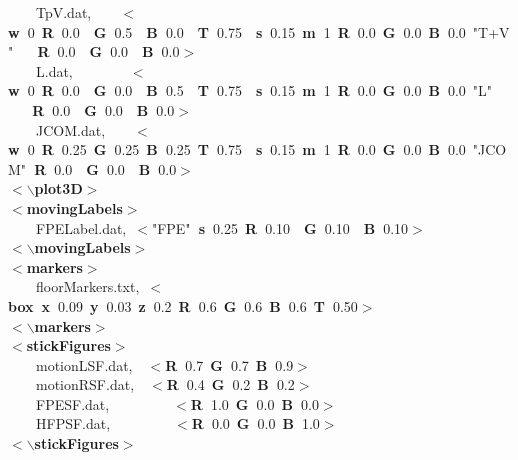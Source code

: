 \documentclass{article}
\newcommand{\hlstd}[1]{\textcolor[rgb]{0,0,0}{#1}}
\newcommand{\hlkey}[1]{\textcolor[rgb]{0,0,1}{\bf{#1}}}
\newcommand{\hlnum}[1]{\textcolor[rgb]{0.66,0,0.66}{#1}}
\newcommand{\hlstr}[1]{\textcolor[rgb]{1,0,0}{#1}}
\begin{document}
{\hlstd{\ \ \ \ }TpV.dat,\hlstd{\ \ \ \ }}\hlkey{$<$w\ }\hlnum{0\ }\hlkey{R\ }\hlnum{0.0\hlstd{\ \ }}\hlkey{G\ }\hlnum{0.5\hlstd{\ \ }}\hlkey{B\ }\hlnum{0.0\hlstd{\ \ }}\hlkey{T\ }\hlnum{0.75\hlstd{\ \ }}\hlkey{s\ }\hlnum{0.15\ }\hlkey{m\ }\hlnum{1\ }\hlkey{R\ }\hlnum{0.0\ }\hlkey{G\ }\hlnum{0.0\ }\hlkey{B\ }\hlnum{0.0\ }\hlkey{}\hlstr{"T+V"}\hlkey{\hlstd{\ \ \ }R\ }\hlnum{0.0\hlstd{\ \ }}\hlkey{G\ }\hlnum{0.0\hlstd{\ \ }}\hlkey{B\ }\hlnum{0.0}\hlkey{$>$}\hlstd{\\
\hlstd{\ \ \ \ }L.dat,\hlstd{\ \ \ \ \ \ \ \ }}\hlkey{$<$w\ }\hlnum{0\ }\hlkey{R\ }\hlnum{0.0\hlstd{\ \ }}\hlkey{G\ }\hlnum{0.0\hlstd{\ \ }}\hlkey{B\ }\hlnum{0.5\hlstd{\ \ }}\hlkey{T\ }\hlnum{0.75\hlstd{\ \ }}\hlkey{s\ }\hlnum{0.15\ }\hlkey{m\ }\hlnum{1\ }\hlkey{R\ }\hlnum{0.0\ }\hlkey{G\ }\hlnum{0.0\ }\hlkey{B\ }\hlnum{0.0\ }\hlkey{}\hlstr{"L"}\hlkey{\hlstd{\ \ \ \ \ }R\ }\hlnum{0.0\hlstd{\ \ }}\hlkey{G\ }\hlnum{0.0\hlstd{\ \ }}\hlkey{B\ }\hlnum{0.0}\hlkey{$>$}\hlstd{\\
\hlstd{\ \ \ \ }JCOM.dat,\hlstd{\ \ \ \ }}\hlkey{$<$w\ }\hlnum{0\ }\hlkey{R\ }\hlnum{0.25\ }\hlkey{G\ }\hlnum{0.25\ }\hlkey{B\ }\hlnum{0.25\ }\hlkey{T\ }\hlnum{0.75\hlstd{\ \ }}\hlkey{s\ }\hlnum{0.15\ }\hlkey{m\ }\hlnum{1\ }\hlkey{R\ }\hlnum{0.0\ }\hlkey{G\ }\hlnum{0.0\ }\hlkey{B\ }\hlnum{0.0\ }\hlkey{}\hlstr{"J\textunderscore COM"}\hlkey{\ R\ }\hlnum{0.0\hlstd{\ \ }}\hlkey{G\ }\hlnum{0.0\hlstd{\ \ }}\hlkey{B\ }\hlnum{0.0}\hlkey{$>$}\hlstd{\\
}\hlkey{$<$$\backslash$plot3D$>$}\hlstd{\\
}\hlkey{$<$movingLabels$>$}\hlstd{\\
\hlstd{\ \ \ \ }FPELabel.dat,\ }\hlkey{$<$}\hlstr{"FPE"}\hlkey{\ s\ }\hlnum{0.25\ }\hlkey{R\ }\hlnum{0.10\hlstd{\ \ }}\hlkey{G\ }\hlnum{0.10\hlstd{\ \ }}\hlkey{B\ }\hlnum{0.10}\hlkey{$>$}\hlstd{\\
}\hlkey{$<$$\backslash$movingLabels$>$}\hlstd{\\
}\hlkey{$<$markers$>$}\hlstd{\\
\hlstd{\ \ \ \ }floorMarkers.txt,\ }\hlkey{$<$box\ x\ }\hlnum{0.09\ }\hlkey{y\ }\hlnum{0.03\ }\hlkey{z\ }\hlnum{0.2\ }\hlkey{R\ }\hlnum{0.6\ }\hlkey{G\ }\hlnum{0.6\ }\hlkey{B\ }\hlnum{0.6\ }\hlkey{T\ }\hlnum{0.50}\hlkey{$>$}\hlstd{\\
}\hlkey{$<$$\backslash$markers$>$}\hlstd{\\
}\hlkey{$<$stickFigures$>$}\hlstd{\\
\hlstd{\ \ \ \ }motionL\textunderscore SF.dat,\hlstd{\ \ }}\hlkey{$<$R\ }\hlnum{0.7\ }\hlkey{G\ }\hlnum{0.7\ }\hlkey{B\ }\hlnum{0.9}\hlkey{$>$}\hlstd{\\
\hlstd{\ \ \ \ }motionR\textunderscore SF.dat,\hlstd{\ \ }}\hlkey{$<$R\ }\hlnum{0.4\ }\hlkey{G\ }\hlnum{0.2\ }\hlkey{B\ }\hlnum{0.2}\hlkey{$>$}\hlstd{\\
\hlstd{\ \ \ \ }FPE\textunderscore SF.dat,\hlstd{\ \ \ \ \ \ \ \ \ }}\hlkey{$<$R\ }\hlnum{1.0\ }\hlkey{G\ }\hlnum{0.0\ }\hlkey{B\ }\hlnum{0.0}\hlkey{$>$}\hlstd{\\
\hlstd{\ \ \ \ }HFP\textunderscore SF.dat,\hlstd{\ \ \ \ \ \ \ \ \ }}\hlkey{$<$R\ }\hlnum{0.0\ }\hlkey{G\ }\hlnum{0.0\ }\hlkey{B\ }\hlnum{1.0}\hlkey{$>$}\hlstd{\\
}\hlkey{$<$$\backslash$stickFigures$>$}\hlstd{}\mbox{}\\
\mbox{}\\
\normalfont
\end{document}
